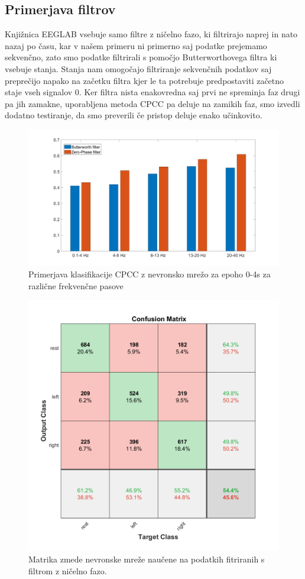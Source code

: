 \subsection{Primerjava filtrov}
Knjižnica EEGLAB vsebuje samo filtre z ničelno fazo, ki filtrirajo naprej in nato nazaj po času, kar v našem primeru ni primerno saj podatke prejemamo sekvenčno, zato smo podatke filtrirali s pomočjo Butterworthovega filtra ki vsebuje stanja. Stanja nam omogočajo filtriranje sekvenčnih podatkov saj preprečijo napako na začetku filtra kjer le ta potrebuje predpostaviti začetno staje vseh signalov 0. Ker filtra nista enakovredna saj prvi ne spreminja faz drugi pa jih zamakne, uporabljena metoda CPCC pa deluje na zamikih faz, smo izvedli dodatno testiranje, da smo preverili če pristop deluje enako učinkovito.
\begin{figure}[h!]
    \begin{center}
    \includegraphics[width=1 \linewidth]{slike/ComparisonFilters.png}
    \end{center}
    \caption{Primerjava klasifikacije CPCC z nevronsko mrežo za epoho 0-4s za različne frekvenčne pasove}
\end{figure}

\begin{figure}[h!]
    \begin{center}
    \includegraphics[width=0.5\linewidth]{slike/Confusion_eeglab.png}
    \end{center}
    \caption{Matrika zmede nevronske mreže naučene na podatkih fitriranih s filtrom z ničelno fazo.}
    \end{figure}
    
